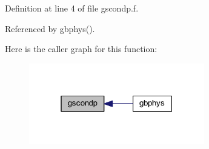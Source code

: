 Definition at line 4 of file gscondp.\+f.



Referenced by gbphys().



Here is the caller graph for this function\+:\nopagebreak
\begin{figure}[H]
\begin{center}
\leavevmode
\includegraphics[width=217pt]{gscondp_8f_a604b82ae595aa7783efaa32cfde39e98_icgraph}
\end{center}
\end{figure}



